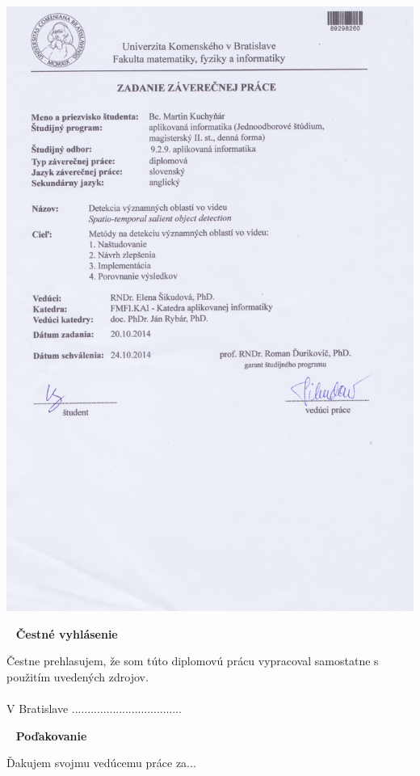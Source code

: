 \newpage
\thispagestyle{empty}
\vspace*{-35px}\hspace*{-30px}
\includegraphics[scale=0.2]{pics/zadanie.jpeg}

\newpage
{~}\vfill
{\noindent \large\bf Čestné vyhlásenie}
\vspace{1.5cm}

Čestne prehlasujem, že som túto diplomovú prácu vypracoval samostatne s použitím uvedených zdrojov.\\\\
V Bratislave
\hfill ...................................
\vspace{1cm}

\newpage
{~}\vfill
{\noindent\large\bf Poďakovanie}
\vspace{1.5cm}

Ďakujem svojmu vedúcemu práce za...  \\
\vspace{1cm}

\newpage
